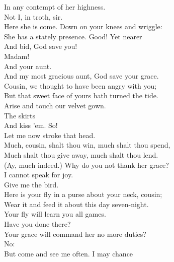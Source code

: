 \documentclass[a4paper,oneside,12pt]{memoir}
\begin{document}
\begin{drama*}
In any contempt of her highness.\\
\dapperspeaks {} Not I, in troth, sir.\\
\subtlespeaks Here she is come. Down on your knees and wriggle:\\
She has a stately presence. Good! Yet nearer\\
And bid, God save you!\\
\dapperspeaks {} Madam!\\
\subtlespeaks {} And your aunt.\\
\dapperspeaks And my most gracious aunt, God save your grace.\\
\dolspeaks Cousin, we thought to have been angry with you;\\
But that sweet face of yours hath turned the tide.\\
Arise and touch our velvet gown.\\
\subtlespeaks {} The skirts\\
And kiss 'em. So!\\
\dolspeaks {} Let me now stroke that head.\\
Much, cousin, shalt thou win, much shalt thou spend,\\
Much shalt thou give away, much shalt thou lend.\\
\subtlespeaks (Ay, much indeed.) Why do you not thank her grace?\\
\dapperspeaks I cannot speak for joy.\\
\dolspeaks {} Give me the bird.\\
Here is your fly in a purse about your neck, cousin;\\
Wear it and feed it about this day seven-night.\\
\subtlespeaks Your fly will learn you all games.\\
\facespeaks {}  Have you done there?\\
\subtlespeaks Your grace will command her no more duties?\\
\dolspeaks {} No:\\
But come and see me often. I may chance\\

\end{drama*}
\end{document}
